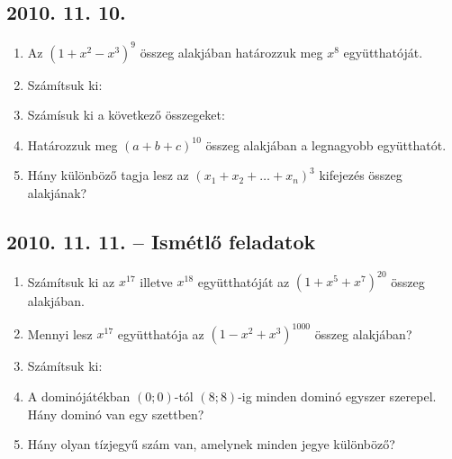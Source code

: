 \subsection*{2010. 11. 10.}
\begin{enumerate}
\item Az $(1+x^{2}-x^{3})^{9}$ összeg alakjában határozzuk meg $x^{8}$ együtthatóját.
\item Számítsuk ki:
\item Számísuk ki a következő összegeket:
\item Határozzuk meg $(a+b+c)^{10}$ összeg alakjában a legnagyobb együtthatót.
\item Hány különböző tagja lesz az $(x_{1}+x_{2}+\dots+x_{n})^{3}$ kifejezés összeg alakjának?
\end{enumerate}


\subsection*{2010. 11. 11. -- Ismétlő feladatok}
\begin{enumerate}
\item Számítsuk ki az $x^{17}$ illetve $x^{18}$ együtthatóját az $(1+x^{5}+x^{7})^{20}$ összeg alakjában.
\item Mennyi lesz $x^{17}$ együtthatója az $(1-x^{2}+x^{3})^{1000}$ összeg alakjában?
\item Számítsuk ki:
\item A dominójátékban $(0;0)$-tól $(8;8)$-ig minden dominó egyszer szerepel. Hány dominó van egy szettben?
\item Hány olyan tízjegyű szám van, amelynek minden jegye különböző?
\end{enumerate}


